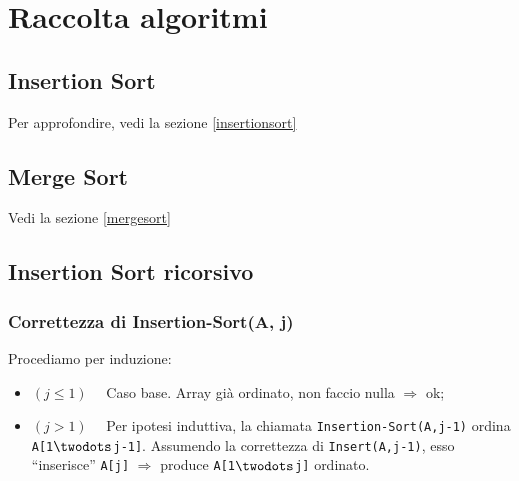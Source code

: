 \appendix
\appendixpage
\addappheadtotoc 

\section{Raccolta algoritmi}

\subsection{Insertion Sort}
Per approfondire, vedi la sezione \ref{insertionsort} 


\subsection{Merge Sort}
Vedi la sezione \ref{mergesort}



\subsection{Insertion Sort ricorsivo}




\subsubsection{Correttezza di Insertion-Sort(A, j)}
Procediamo per induzione:
\begin{itemize}
	\item[] $(j \leq 1) \quad$ Caso base. Array già ordinato, non faccio nulla $\Rightarrow$ ok;
	\item[] $(j > 1) \quad$ Per ipotesi induttiva, la chiamata \texttt{Insertion-Sort(A,j-1)}
	ordina \texttt{A[1$\twodots$j-1]}. Assumendo la correttezza di \texttt{Insert(A,j-1)}, esso
	``inserisce'' \texttt{A[j]} $\Rightarrow$ produce \texttt{A[1$\twodots$j]} ordinato.
\end{itemize}

